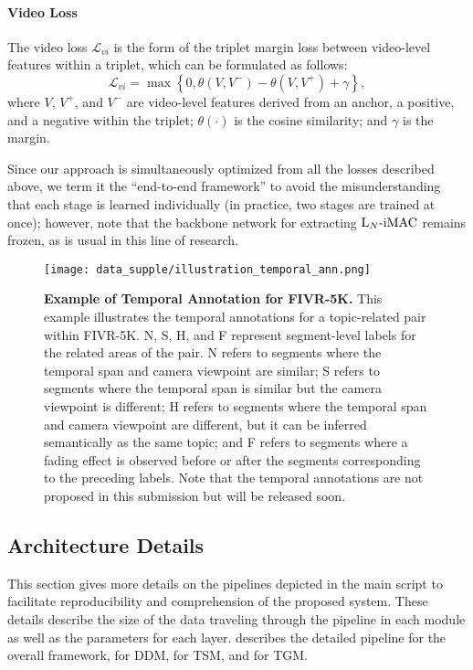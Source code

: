 \documentclass[10pt,twocolumn,letterpaper]{article}
\begin{document}
        \paragraph{Video Loss \\}
        The video loss $\mathcal{L}_{vi}$ is the form of the triplet margin loss between video-level features within a triplet, which can be formulated as follows:
        \begin{equation}
            \mathcal{L}_{vi}=\max \left\{ 0,\theta \left( V,V^{-}\right) -\theta \left( V,V^{+}\right) +\gamma \right\},
        \end{equation}
        where $V$, $V^{+}$, and $V^{-}$ are video-level features derived from an anchor, a positive, and a negative within the triplet; $\theta (\cdot )$ is the cosine similarity; and $\gamma$ is the margin.

        Since our approach is simultaneously optimized from all the losses described above, we term it the ``end-to-end framework'' to avoid the misunderstanding that each stage is learned individually (in practice, two stages are trained at once); however, note that the backbone network for extracting $\textup{L}_{N}\textup{-iMAC}$ remains frozen, as is usual in this line of research.


    
        \begin{figure}[!t]
            \centering
            \texttt{[image: data\_supple/illustration\_temporal\_ann.png]} 
            \caption{\textbf{Example of Temporal Annotation for FIVR-5K.} This example illustrates the temporal annotations for a topic-related pair within FIVR-5K. N, S, H, and F represent segment-level labels for the related areas of the pair. N refers to segments where the temporal span and camera viewpoint are similar; S refers to segments where the temporal span is similar but the camera viewpoint is different; H refers to segments where the temporal span and camera viewpoint are different, but it can be inferred semantically as the same topic; and F refers to segments where a fading effect is observed before or after the segments corresponding to the preceding labels. Note that the temporal annotations are not proposed in this submission but will be released soon.\vspace{-0mm}} \label{fig:temporal_ann}
        \end{figure}

    \subsection{Architecture Details}\label{arch}
        This section gives more details on the pipelines depicted in the main script to facilitate reproducibility and comprehension of the proposed system. These details describe the size of the data traveling through the pipeline in each module as well as the parameters for each layer.
         describes the detailed pipeline for the overall framework,  for DDM,  for TSM, and  for TGM.
    
\end{document}
